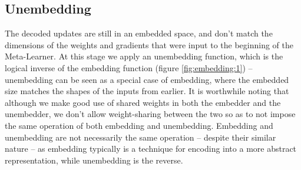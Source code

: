 \documentclass{report}
\begin{document}
\subsection{Unembedding}
The decoded updates are still in an embedded space, and don't match the dimensions of the weights and gradients that were input to the beginning of the Meta-Learner. At this stage we apply an unembedding function, which is the logical inverse of the embedding function (figure \ref{fig:embedding:1}) -- unembedding can be seen as a special case of embedding, where the embedded size matches the shapes of the inputs from earlier. It is worthwhile noting that although we make good use of shared weights in both the embedder and the unembedder, we don't allow weight-sharing between the two so as to not impose the same operation of both embedding and unembedding. Embedding and unembedding are not necessarily the same operation -- despite their similar nature -- as embedding typically is a technique for encoding into a more abstract representation, while unembedding is the reverse.
\end{document}
